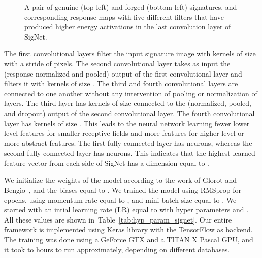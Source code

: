 \documentclass[times,twocolumn,final]{elsarticle}
\newcommand{\tab}[1]{Table~\ref{#1}}
\begin{document}
\begin{figure*}[thb]
\centering
{}
\caption{A pair of genuine (top left) and forged (bottom left) signatures, and corresponding response maps with five different filters that have produced higher energy activations in the last convolution layer of SigNet.}
\label{fig:activ_filters_layer4}
\end{figure*}

The first convolutional layers filter the  input signature image with  kernels of size  with a stride of  pixels. The second convolutional layer takes as input the (response-normalized and pooled) output of the first convolutional layer and filters it with  kernels of size . The third and fourth convolutional layers are connected to one another without any intervention of pooling or normalization of layers. The third layer has  kernels of size  connected to the (normalized, pooled, and dropout) output of the second convolutional layer. The fourth convolutional layer has  kernels of size . 
This leads to the neural network learning fewer lower level
features  for  smaller  receptive  fields  and  more  features  for
higher level or more abstract features.
The first fully connected layer has  neurons, whereas the second fully connected layer has  neurons. This indicates that the highest learned feature vector from each side of SigNet has a dimension equal to .

We initialize the weights of the model according to the work of Glorot and Bengio~\cite{Glorot2010}, and the biases equal to . We trained the model using RMSprop for  epochs, using momentum rate equal to , and mini batch size equal to . We started with an intial learning rate (LR) equal to  with hyper parameters  and . All these values are shown in~\tab{tab:hyp_param_signet}. Our entire framework is implemented using Keras library with the TensorFlow as backend. The training was done using a GeForce GTX  and a TITAN X Pascal GPU, and it took  to  hours to run approximately, depending on different databases.
\end{document}
